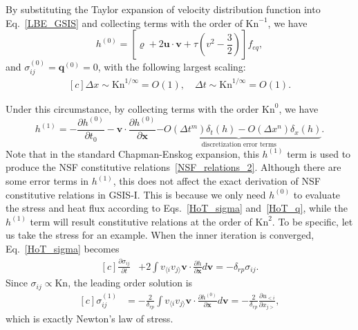 \documentclass[onefignum,onetabnum]{siamart171218}
\newcounter{example}
\begin{document}
By substituting  the Taylor expansion of velocity distribution function into Eq.~\eqref{LBE_GSIS} and collecting terms with the order of $\text{Kn}^{-1}$, we have 
\begin{equation}\label{feq_zero}
h^{(0)}=\left[\varrho+2\bm{u}\cdot\bm{v}+\tau\left(v^2-\frac{3}{2}\right)\right]f_{eq},
\end{equation}
and $\sigma^{(0)}_{ij}=\bm{q}^{(0)}=0$, with the following largest scaling:
\begin{equation}\label{scaling1}
\begin{aligned}[c]
\Delta{x}\sim{\text{Kn}^{1/\infty}}=O(1),\quad
\Delta{t}\sim{}{\text{Kn}^{1/\infty}}=O(1).
\end{aligned}
\end{equation}



Under this circumstance, by collecting terms with the order $\text{Kn}^{0}$, we have
\begin{equation}\label{h1_taylor}
h^{(1)}=-\frac{\partial h^{(0)}}{\partial t_0}-\bm{v}\cdot\frac{\partial{h^{(0)}}}{\partial\bm{x}}
\underbrace{-O(\Delta{t}^m)\delta_t(h)
-O(\Delta{x}^n)\delta_x(h)}_{\text{discretization error terms}}.
\end{equation}
Note that in the standard Chapman-Enskog expansion, this $h^{(1)}$ term is used to produce the NSF constitutive relations~\eqref{NSF_relations_2}. Although there are some error terms in $h^{(1)}$, this does not affect the exact derivation of NSF constitutive relations in GSIS-I. This is because we only need $h^{(0)}$ to evaluate the stress and heat flux according to Eqs.~\eqref{HoT_sigma} and~\eqref{HoT_q}, while the $h^{(1)}$ term will result constitutive relations at the order of $\text{Kn}^2$. To be specific, let us take the stress for an example. When the inner iteration is converged, Eq.~\eqref{HoT_sigma}
becomes
\begin{equation}\label{HoT_sigma_section5}
\begin{aligned}[c]
\frac{\partial \sigma_{ij}}{\partial {t}}
&+2\int{v_{\langle{i}}v_{j\rangle}} \bm{v}\cdot\frac{\partial h}{\partial \bm{x}}d\bm{v}=-\delta_{rp}\sigma_{ij}.
\end{aligned}
\end{equation}
Since $\sigma_{ij}\propto\text{Kn}$, the leading order solution is
\begin{equation}
\begin{aligned}[c]
\sigma^{(1)}_{ij}&=-\frac{2}{\delta_{rp}}\int{v_{\langle{i}}v_{j\rangle}} \bm{v}\cdot\frac{\partial h^{(0)}}{\partial \bm{x}}d\bm{v}
=-\frac{2}{\delta_{rp}}\frac{\partial u_{<i}}{\partial {x_{j>}}},
\end{aligned}
\end{equation}
which is exactly Newton's law of stress. 
\end{document}
